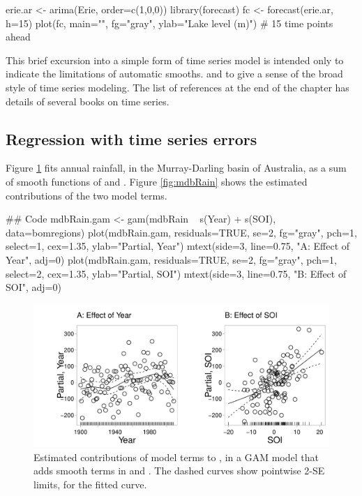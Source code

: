 \begin{marginfigure}[-5cm]
\begin{Schunk}
\begin{Sinput}
erie.ar <- arima(Erie,
            order=c(1,0,0))
library(forecast)
fc <- forecast(erie.ar,
               h=15)
plot(fc, main="", fg="gray",
     ylab="Lake level (m)")
  # 15 time points ahead
\end{Sinput}
\end{Schunk}
\end{marginfigure}

This brief excursion into a simple form of time series model is
intended only to indicate the limitations of automatic smooths.  and
to give a sense of the broad style of time series modeling.  The list
of references at the end of the chapter has details of several books
on time series.

\subsection{Regression with time series errors}

Figure \ref{fig:mdbRainSM} fits annual rainfall, in the Murray-Darling basin of
Australia, as a sum of smooth functions of  and .
Figure \ref{fig:mdbRain} shows the estimated contributions of the two
model terms.
\begin{Schunk}
\begin{Sinput}
## Code
mdbRain.gam <- gam(mdbRain ~ s(Year) + s(SOI),
                   data=bomregions)
plot(mdbRain.gam, residuals=TRUE, se=2, fg="gray",
     pch=1, select=1, cex=1.35, ylab="Partial, Year")
mtext(side=3, line=0.75, "A: Effect of Year", adj=0)
plot(mdbRain.gam, residuals=TRUE, se=2, fg="gray",
     pch=1, select=2, cex=1.35, ylab="Partial, SOI")
mtext(side=3, line=0.75, "B: Effect of SOI", adj=0)
\end{Sinput}
\end{Schunk}
\begin{figure}
\begin{Schunk}


\centerline{\includegraphics[width=\textwidth]{figs/9-mdb-gam-1} }

\end{Schunk}
  \caption{Estimated contributions of model terms to
    , in a GAM model that adds smooth terms in
     and . The dashed curves show pointwise
    2-SE limits, for the fitted curve.}\label{fig:mdbRainSM}
\end{figure}

